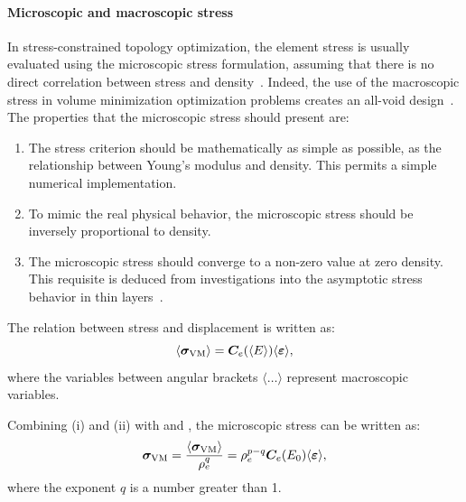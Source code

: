 \paragraph{Microscopic and macroscopic stress}
In stress-constrained topology optimization, the element stress is usually evaluated using the microscopic stress formulation, assuming that there is no direct correlation between stress and density~. Indeed, the use of the macroscopic stress in volume minimization optimization problems creates an all-void design~. The properties that the microscopic stress should present are:
\begin{enumerate}[label=(\roman*)]
    \item The stress criterion should be mathematically as simple as possible, as the relationship between Young's modulus and density. This permits a simple numerical implementation.
    \item To mimic the real physical behavior, the microscopic stress should be inversely proportional to density.
    \item The microscopic stress should converge to a non-zero value at zero density. This requisite is deduced from investigations into the asymptotic stress behavior in thin layers~.
\end{enumerate}

The relation between stress and displacement is written as:
\begin{equation}
    \langle \bm{\sigma}_{\text{VM}} \rangle = \bm{C}_e(\langle E \rangle) \langle \bm{\varepsilon} \rangle,
    \label{eq:03_stress_disp}
\end{equation}
where the variables between angular brackets $\langle \dots \rangle$ represent macroscopic variables. 

Combining (i) and (ii) with  and , the microscopic stress can be written as:
\begin{equation}
    \bm{\sigma}_{\text{VM}} = \frac{\langle \bm{\sigma}_{\text{VM}} \rangle}{\rho^q_e} = \rho_e^{p-q} \bm{C}_e(E_0)\langle \bm{\varepsilon} \rangle,
\end{equation}
where the exponent $q$ is a number greater than 1.


